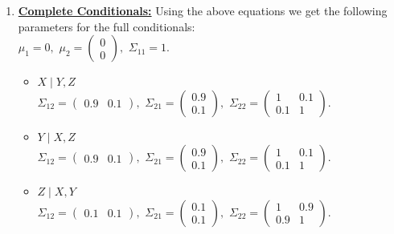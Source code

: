 \documentclass{article}
\begin{document}
\pagebreak

\begin{enumerate}
\item {\underline{\textbf{Complete Conditionals:}}} Using the above equations we get the following parameters for the full conditionals:\\
$\mu_1 = 0,$
$\mu_2 = \left(\begin{matrix}0\\0\end{matrix}\right),$
$\Sigma_{11} = 1.$\\
\begin{itemize}
\item $X \mid Y,Z$\\
$\Sigma_{12} = \left(\begin{matrix}0.9&0.1\end{matrix}\right),$
$\Sigma_{21} = \left(\begin{matrix}0.9\\0.1\end{matrix}\right),$
$\Sigma_{22} = \left(\begin{matrix}1&0.1\\0.1&1\end{matrix}\right).$\\
\item $Y \mid X,Z$\\
$\Sigma_{12} = \left(\begin{matrix}0.9&0.1\end{matrix}\right),$
$\Sigma_{21} = \left(\begin{matrix}0.9\\0.1\end{matrix}\right),$
$\Sigma_{22} = \left(\begin{matrix}1&0.1\\0.1&1\end{matrix}\right).$\\
\item $Z \mid X,Y$\\
$\Sigma_{12} = \left(\begin{matrix}0.1&0.1\end{matrix}\right),$
$\Sigma_{21} = \left(\begin{matrix}0.1\\0.1\end{matrix}\right),$
$\Sigma_{22} = \left(\begin{matrix}1&0.9\\0.9&1\end{matrix}\right).$\\
\end{itemize}


\end{enumerate}
\end{document}
